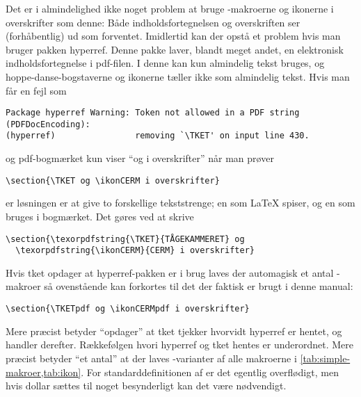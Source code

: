 \documentclass[a4paper,article,oneside,danish]{memoir}
\newcommand{\pakkenavn}[1]{\textsf{#1}}
\newcommand{\ptket}{\pakkenavn{tket}\xspace}
\newcommand*{\optionname}[1]{\textcolor{option}{#1}}
\begin{document}
Det er i almindelighed ikke noget problem at bruge -makroerne
og ikonerne i overskrifter som denne: Både indholdsfortegnelsen og
overskriften ser (forhåbentlig) ud som forventet. Imidlertid kan der
opstå et problem hvis man bruger pakken \pakkenavn{hyperref}. Denne
pakke laver, blandt meget andet, en elektronisk indholdsfortegnelse i
pdf-filen. I denne kan kun almindelig tekst bruges, og
hoppe-danse-bogstaverne og ikonerne tæller ikke som almindelig
tekst. Hvis man får en fejl som
\begin{verbatim}
Package hyperref Warning: Token not allowed in a PDF string (PDFDocEncoding):
(hyperref)                removing `\TKET' on input line 430.
\end{verbatim}
og pdf-bogmærket kun viser \enquote{og i overskrifter} når man prøver
\begin{verbatim}
\section{\TKET og \ikonCERM i overskrifter}
\end{verbatim}
er løsningen er at give to
forskellige tekststrenge; en som \LaTeX{} spiser, og en som bruges i
bogmærket. Det gøres ved at skrive
\begin{verbatim}
\section{\texorpdfstring{\TKET}{TÅGEKAMMERET} og
  \texorpdfstring{\ikonCERM}{CERM} i overskrifter}
\end{verbatim}

Hvis \ptket opdager at \pakkenavn{hyperref}-pakken er i brug laves der
automagisk et antal -makroer så ovenstående kan forkortes
til det der faktisk er brugt i denne manual:
\begin{verbatim}
\section{\TKETpdf og \ikonCERMpdf i overskrifter}
\end{verbatim}
Mere præcist betyder \enquote{opdager} at \ptket tjekker 
hvorvidt \pakkenavn{hyperref} er hentet, og handler
derefter. Rækkefølgen hvori \pakkenavn{hyperref} og \ptket hentes er
underordnet. Mere præcist betyder \enquote{et antal} at der laves
-varianter af alle makroerne i \vref{tab:simple-makroer,tab:ikon}.
For standarddefinitionen af  er det
egentlig overflødigt, men hvis \optionname{dollar} sættes til noget
besynderligt kan det være nødvendigt.
\end{document}

